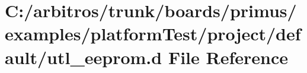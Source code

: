 \hypertarget{boards_2primus_2examples_2platform_test_2project_2default_2utl__eeprom_8d}{\section{C\-:/arbitros/trunk/boards/primus/examples/platform\-Test/project/default/utl\-\_\-eeprom.d File Reference}
\label{boards_2primus_2examples_2platform_test_2project_2default_2utl__eeprom_8d}
}
